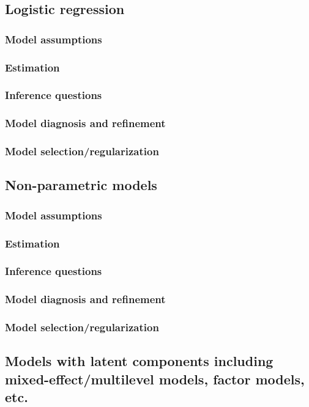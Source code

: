 \documentclass{article}
\begin{document}
\subsection{Logistic regression}
\subsubsection{Model assumptions}
\subsubsection{Estimation}
\subsubsection{Inference questions}
\subsubsection{Model diagnosis and refinement}
\subsubsection{Model selection/regularization}

\subsection{Non-parametric models}
\subsubsection{Model assumptions}
\subsubsection{Estimation}
\subsubsection{Inference questions}
\subsubsection{Model diagnosis and refinement}
\subsubsection{Model selection/regularization}

\subsection{Models with latent components including mixed-effect/multilevel models, factor models, etc.}
\end{document}
